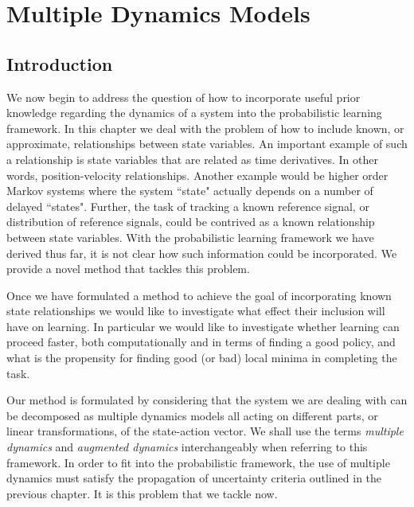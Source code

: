 \chapter{M\lowercase{ultiple} D\lowercase{ynamics} M\lowercase{odels}} 

\section{Introduction}
We now begin to address the question of how to incorporate useful prior knowledge regarding the dynamics of a system into the probabilistic learning framework. In this chapter we deal with the problem of how to include known, or approximate, relationships between state variables. An important example of such a relationship is state variables that are related as time derivatives. In other words, position-velocity relationships. Another example would be higher order Markov systems where the system ``state" actually depends on a number of delayed ``states". Further, the task of tracking a known reference signal, or distribution of reference signals, could be contrived as a known relationship between state variables. With the probabilistic learning framework we have derived thus far, it is not clear how such information could be incorporated. We provide a novel method that tackles this problem.


Once we have formulated a method to achieve the goal of incorporating known state relationships we would like to investigate what effect their inclusion will have on learning. In particular we would like to investigate whether learning can proceed faster, both computationally and in terms of finding a good policy, and what is the propensity for finding good (or bad) local minima in completing the task.

Our method is formulated by considering that the system we are dealing with can be decomposed as multiple dynamics models all acting on different parts, or linear transformations, of the state-action vector. We shall use the terms \textit{multiple dynamics} and \textit{augmented dynamics} interchangeably when referring to this framework. In order to fit into the probabilistic framework, the use of multiple dynamics must satisfy the propagation of uncertainty criteria outlined in the previous chapter. It is this problem that we tackle now.



